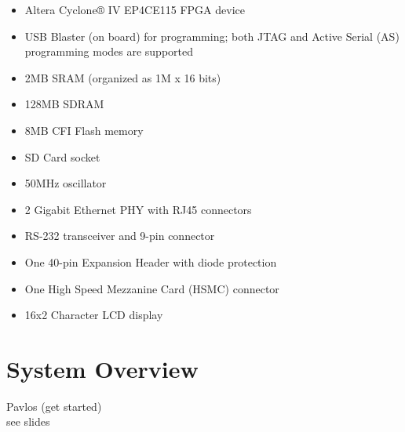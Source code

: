 \begin{itemize}
 \item Altera Cyclone® IV EP4CE115 FPGA device 
 \item USB Blaster (on board) for programming; both JTAG and Active Serial (AS) programming modes are supported 
 \item 2MB SRAM (organized as 1M x 16 bits)
 \item 128MB SDRAM
 \item 8MB CFI Flash memory
 \item SD Card socket
 \item 50MHz oscillator
 \item 2 Gigabit Ethernet PHY with RJ45 connectors 
 \item RS-232 transceiver and 9-pin connector 
 \item One 40-pin Expansion Header with diode protection 
 \item One High Speed Mezzanine Card (HSMC) connector 
 \item 16x2 Character LCD display
\end{itemize}




\section{System Overview}
Pavlos (get started) \\
see slides